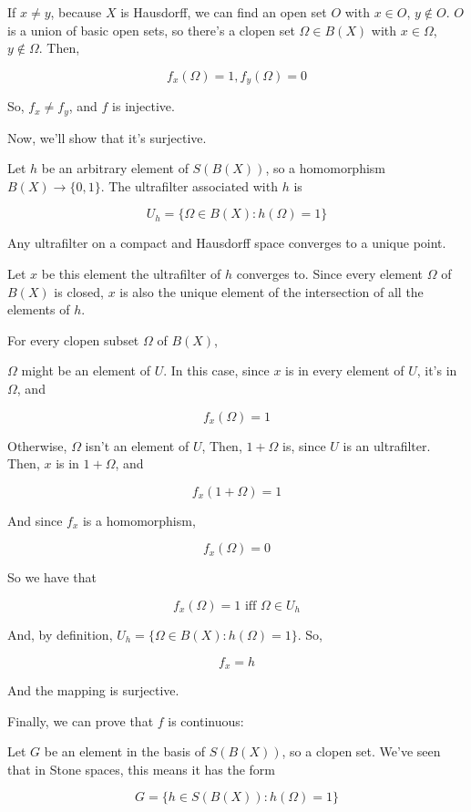 \documentclass{article}
\begin{document}
      If $x \neq y$, because $X$ is Hausdorff, we can find an open set $O$ with
      $x \in O$, $y \notin O$. $O$ is a union of basic open sets, so there's a
      clopen set $\Omega \in B(X)$ with $x \in \Omega$, $y\notin \Omega$. Then,

      \[f_x(\Omega) = 1, f_y(\Omega) = 0\]

      So, $f_x \neq f_y$, and $f$ is injective.

      Now, we'll show that it's surjective.

      Let $h$ be an arbitrary element of $S(B(X))$, so a homomorphism $B(X)
      \rightarrow \{0,1\}$. The ultrafilter associated with $h$ is

      \[U_h = \{\Omega \in B(X) : h(\Omega) = 1\}\]

      Any ultrafilter on a compact and Hausdorff space converges to a unique
      point.

      Let $x$ be this element the ultrafilter of $h$ converges to. Since every
      element $\Omega$ of $B(X)$ is closed, $x$ is also the unique element of
      the intersection of all the elements of $h$.

      For every clopen subset $\Omega$ of $B(X)$,

      $\Omega$ might be an element of $U$. In this case, since $x$ is in every
      element of $U$, it's in $\Omega$, and

      \[f_x(\Omega) = 1\]

      Otherwise, $\Omega$ isn't an element of $U$, Then, $1+\Omega$ is, since
      $U$ is an ultrafilter. Then, $x$ is in $1+\Omega$, and

      \[f_x(1+\Omega) = 1\]

      And since $f_x$ is a homomorphism,

      \[f_x(\Omega) = 0\]

      So we have that

      \[f_x(\Omega) = 1 \text{ iff } \Omega \in U_h\]

      And, by definition, $U_h = \{\Omega \in B(X) : h(\Omega) = 1\}$. So,

      \[f_x = h\]

      And the mapping is surjective.

      Finally, we can prove that $f$ is continuous:

      Let $G$ be an element in the basis of $S(B(X))$, so a clopen set. We've
      seen that in Stone spaces, this means it has the form

      \[G = \{h \in S(B(X)): h(\Omega) = 1\}\]
\end{document}
